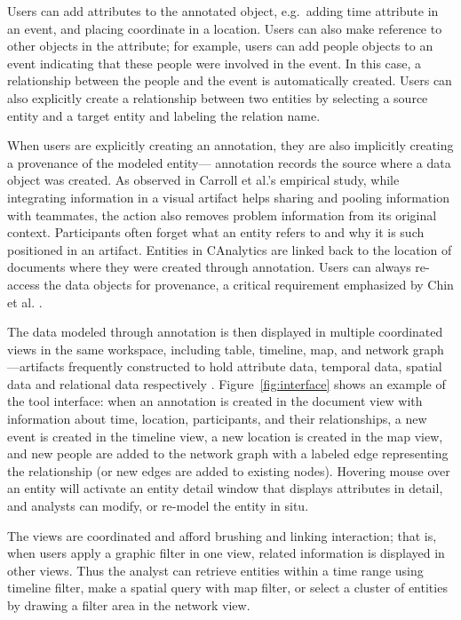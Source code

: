 Users can add attributes to the annotated object, e.g.~adding time
attribute in an event, and placing coordinate in a location. Users can
also make reference to other objects in the attribute; for example,
users can add people objects to an event indicating that these people
were involved in the event. In this case, a relationship between the
people and the event is automatically created. Users can also explicitly
create a relationship between two entities by selecting a source entity
and a target entity and labeling the relation name.

When users are explicitly creating an annotation, they are also
implicitly creating a provenance of the modeled entity--- annotation
records the source where a data object was created. As observed in
Carroll et al.'s \autocite{Carroll2013} empirical study, while
integrating information in a visual artifact helps sharing and pooling
information with teammates, the action also removes problem information
from its original context. Participants often forget what an entity
refers to and why it is such positioned in an artifact. Entities in
CAnalytics are linked back to the location of documents where they were
created through annotation. Users can always re-access the data objects
for provenance, a critical requirement emphasized by Chin et al.
\autocite{Chin2009}.

The data modeled through annotation is then displayed in multiple
coordinated views in the same workspace, including table, timeline, map,
and network graph---artifacts frequently constructed to hold attribute
data, temporal data, spatial data and relational data respectively
\autocite{Carroll2013}. Figure~\ref{fig:interface} shows an example of the tool interface:
when an annotation is created in the document view with information
about time, location, participants, and their relationships, a new event
is created in the timeline view, a new location is created in the map
view, and new people are added to the network graph with a labeled edge
representing the relationship (or new edges are added to existing
nodes). Hovering mouse over an entity will activate an entity detail
window that displays attributes in detail, and analysts can modify, or
re-model the entity in situ.

The views are coordinated and afford brushing and linking interaction;
that is, when users apply a graphic filter in one view, related
information is displayed in other views. Thus the analyst can retrieve
entities within a time range using timeline filter, make a spatial query
with map filter, or select a cluster of entities by drawing a filter
area in the network view.

